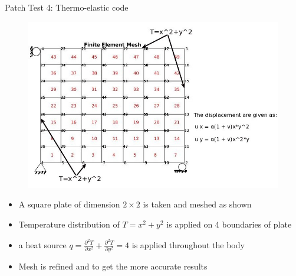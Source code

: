 \documentclass{beamer}
\begin{document}
\begin{frame}[t,fragile]{Patch Test 4: Thermo-elastic code}
    \vspace{-.5cm}
    \footnotesize
\begin{figure}[H]
    \centering
    \includegraphics[scale=.2]{elements_7^2_1.jpg}
\end{figure}
    \vspace{-.5cm}
\begin{itemize}
    \item A square plate of dimension $2\times 2$ is taken and meshed as shown
    \item Temperature distribution of $T=x^2+y^2$ is applied on 4 boundaries of plate
    \item a heat source $q=\frac{\partial^2 T}{\partial x^2}+\frac{\partial^2 T}{\partial y^2}=4$ is applied throughout the body 
    \item Mesh is refined and to get the more accurate results 
\end{itemize}
\end{frame}
\end{document}
